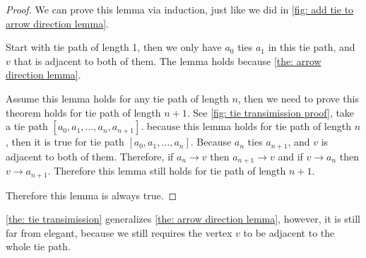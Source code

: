 \begin{proof}
  We can prove this lemma via induction,
  just like we did in
  \cref{fig: add tie to arrow direction lemma}.

  Start with tie path of length 1,
  then we only have \(a_0\) ties \(a_1\) in this tie path,
  and \(v\) that is adjacent to both of them.
  The lemma holds because \cref{the: arrow direction lemma}.

  Assume this lemma holds for any tie path of length \(n\),
  then we need to prove this theorem holds for
  tie path of length \(n + 1\).
  See \cref{fig: tie transimission proof},
  take a tie path \([a_0, a_1, \ldots, a_n, a_{n+1}]\).
  because this lemma holds for tie path of length \(n\),
  then it is true for tie path \([a_0, a_1, \ldots, a_n]\).
  Because \(a_n\) ties \(a_{n+1}\), and
  \(v\) is adjacent to both of them.
  Therefore,
  if \(a_n \to v\) then \(a_{n+1} \to v\) and
  if \(v \to a_n\) then \(v \to a_{n+1}\).
  Therefore this lemma still holds for tie path of length \(n + 1\).

  Therefore this lemma is always true.
\end{proof}

\cref{the: tie transimission} generalizes
\cref{the: arrow direction lemma},
however, it is still far from elegant,
because we still requires the vertex \(v\)
to be adjacent to the whole tie path.
